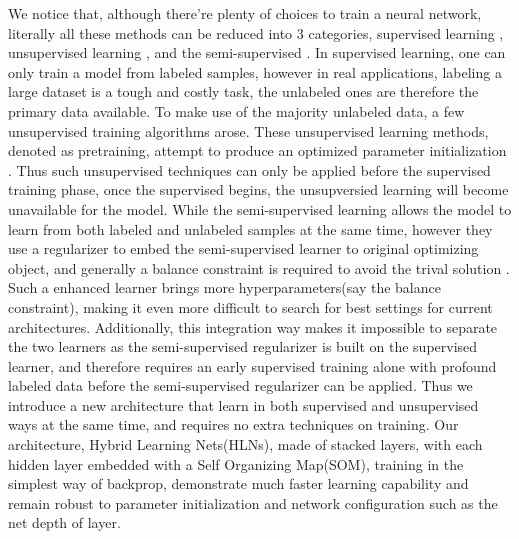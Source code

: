 \documentclass[3p,times,procedia]{elsarticle}
\begin{document}
We notice that, although there're 
plenty of choices to train a 
neural network, literally all 
these methods can be reduced into
3 categories, supervised learning
\cite{lecun1990handwritten}, 
unsupervised learning
\cite{vincent2010stacked}, 
and the semi-supervised
\cite{chapelle2009semi}.
In supervised learning, 
one can only train a model from 
labeled samples, however in real 
applications, labeling a large 
dataset is a tough and costly 
task, the unlabeled ones are 
therefore the primary data 
available. To make use of the 
majority unlabeled data, a few 
unsupervised training algorithms 
arose. These unsupervised learning
methods, denoted as pretraining, 
attempt to produce an optimized 
parameter initialization
\cite{le2013building}.
Thus such unsupervised techniques 
can only be applied before the 
supervised training phase, once 
the supervised begins, the 
unsupversied learning will become 
unavailable for the model.
While the semi-supervised learning
allows the model to learn from
both labeled and unlabeled samples 
at the same time, however they use a
regularizer to embed the semi-supervised
learner to original optimizing object,
and generally a balance constraint is
required to avoid the trival solution
\cite{socher2011semi}.
Such a enhanced learner brings more 
hyperparameters(say the balance 
constraint), making it even more 
difficult to search for best settings
for current architectures. 
Additionally, this integration way 
makes it impossible to separate the 
two learners as the semi-supervised 
regularizer is built on the supervised 
learner, and therefore requires an 
early supervised training alone with 
profound labeled data before the 
semi-supervised regularizer can be
applied.
Thus we introduce a new architecture
that learn in both supervised and 
unsupervised ways at the same time,
and requires no extra techniques on
training. Our architecture, Hybrid
Learning Nets(HLNs), made of 
stacked layers, with each hidden
layer embedded with a Self Organizing
Map(SOM), training in
the simplest way of backprop, 
demonstrate much faster learning
capability and remain robust to 
parameter initialization and
network configuration such as the net
depth of layer.
\end{document}
